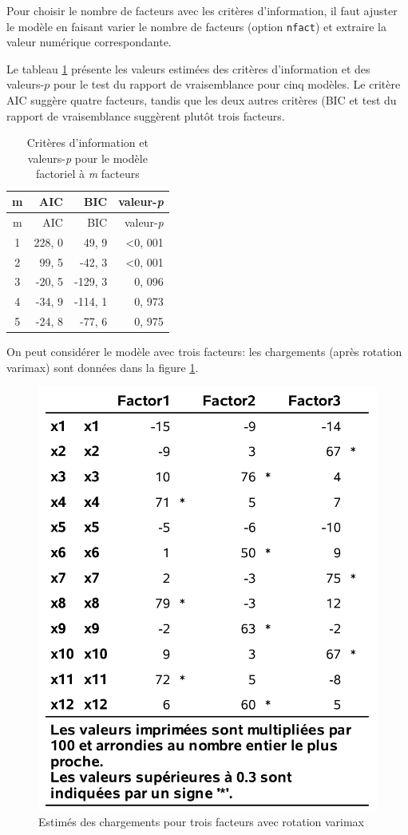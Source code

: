 \documentclass[
]{book}
\theoremstyle{definition}
\theoremstyle{definition}
\theoremstyle{definition}
\theoremstyle{remark}
\begin{document}
Pour choisir le nombre de facteurs avec les critères d'information, il faut ajuster le modèle en faisant varier le nombre de facteurs (option \texttt{nfact}) et extraire la valeur numérique correspondante.

Le tableau \ref{tab:ICtable} présente les valeurs estimées des critères d'information et des valeurs-\(p\) pour le test du rapport de vraisemblance pour cinq modèles. Le critère AIC suggère quatre facteurs, tandis que les deux autres critères (BIC et test du rapport de vraisemblance suggèrent plutôt trois facteurs.

\begin{longtable}[]{@{}crrr@{}}
\caption{\label{tab:ICtable} Critères d'information et valeurs-\emph{p} pour le modèle factoriel à \emph{m} facteurs}\tabularnewline
\toprule
m & AIC & BIC & valeur-\emph{p}\tabularnewline
\midrule
\endfirsthead
\toprule
m & AIC & BIC & valeur-\emph{p}\tabularnewline
\midrule
\endhead
1 & 228, 0 & 49, 9 & \textless0, 001\tabularnewline
2 & 99, 5 & -42, 3 & \textless0, 001\tabularnewline
3 & -20, 5 & -129, 3 & 0, 096\tabularnewline
4 & -34, 9 & -114, 1 & 0, 973\tabularnewline
5 & -24, 8 & -77, 6 & 0, 975\tabularnewline
\bottomrule
\end{longtable}

On peut considérer le modèle avec trois facteurs: les chargements (après rotation varimax) sont données dans la figure \ref{fig:fig1p5}.

\begin{figure}

{\centering \includegraphics[width=0.55\linewidth]{figures/01-facto-e5} 

}

\caption{Estimés des chargements pour trois facteurs avec rotation varimax}\label{fig:fig1p5}
\end{figure}
\end{document}
